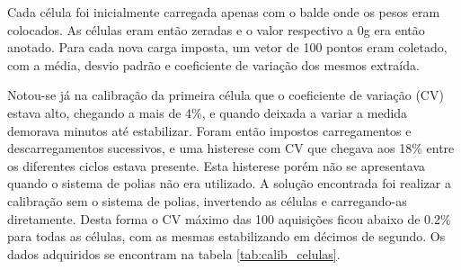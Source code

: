 Cada célula foi inicialmente carregada apenas com o balde onde os pesos eram colocados. As células eram então zeradas e o valor respectivo a 0g era então anotado.
Para cada nova carga imposta, um vetor de 100 pontos eram coletado, com a média, desvio padrão e coeficiente de variação dos mesmos extraída.

Notou-se já na calibração da primeira célula que o coeficiente de variação (CV) estava alto, chegando a mais de 4\%, e quando deixada a variar a medida demorava minutos até estabilizar. Foram então impostos carregamentos e descarregamentos sucessivos, e uma histerese com CV que chegava aos 18\% entre os diferentes ciclos estava presente. Esta histerese porém não se apresentava quando o sistema de polias não era utilizado. A solução encontrada foi realizar a calibração sem o sistema de polias, invertendo as células e carregando-as diretamente. Desta forma o CV máximo das 100 aquisições ficou abaixo de 0.2\% para todas as células, com as mesmas estabilizando em décimos de segundo. Os dados adquiridos se encontram na tabela \ref{tab:calib_celulas}.


